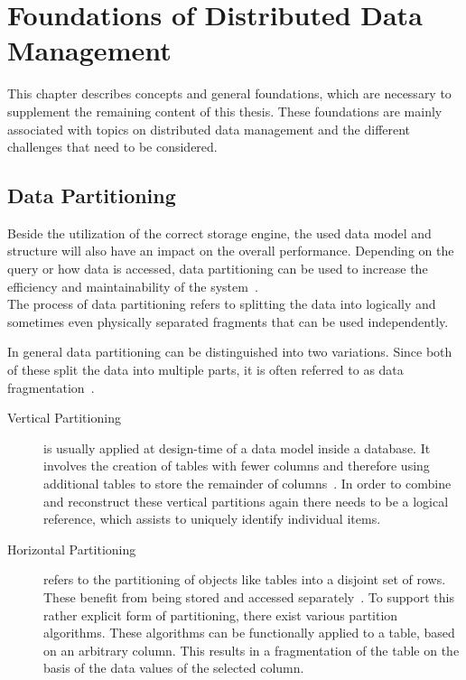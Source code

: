 \chapter{Foundations of Distributed Data Management}
\label{c:Foundation}

This chapter describes concepts and general foundations, which are necessary to supplement 
the remaining content of this thesis. These foundations are mainly associated with topics on distributed data management
and the different challenges that need to be considered.




\section{Data Partitioning}
\label{sec:part}

Beside the utilization of the correct storage engine, the used data model and structure 
will also have an impact on the overall performance. Depending on the query or 
how data is accessed, data partitioning can be used to increase the efficiency and 
maintainability of the system~\cite{Agrawal_2004}.\\
The process of data partitioning refers to splitting the data into logically and sometimes even
physically separated fragments that can be used independently.

In general data partitioning can be distinguished into two variations.
Since both of these split the data into multiple parts, it is often referred to as data fragmentation~\cite{tamer:2005}. 

\begin{description}
    \item [Vertical Partitioning] is usually applied at design-time of a data model inside a 
    database. It involves the creation of tables with fewer columns and therefore using additional 
    tables to store the remainder of columns~\cite{vertical_1984, normalization_2012}.
    In order to combine and reconstruct these vertical partitions again there needs to be a logical reference,
    which assists to uniquely identify individual items. 
    \item [Horizontal Partitioning] refers to the partitioning of objects like tables 
    into a disjoint set of rows. These benefit from being stored and accessed separately~\cite{horizontal_1982}.
    To support this rather explicit form of partitioning, there exist various partition algorithms.
    These algorithms can be functionally applied to a table, based on an arbitrary column. 
    This results in a fragmentation of the table on the basis of the data values of the selected column.
\end{description}

